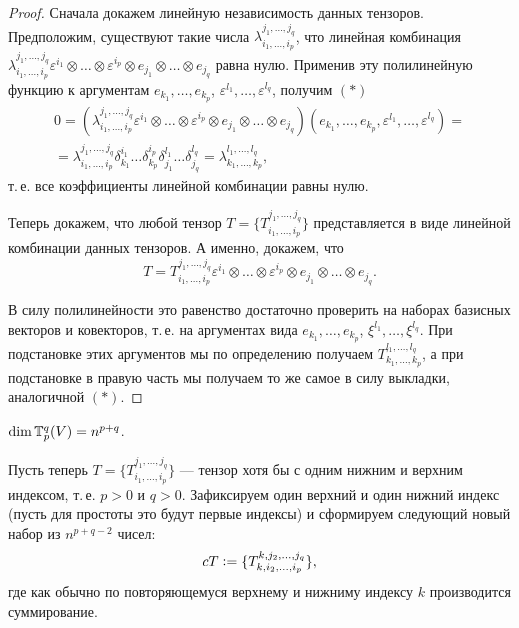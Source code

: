 \begin{proof}
    Сначала докажем линейную независимость данных тензоров. Предположим, существуют такие числа $\lambda_{i_1, \ldots, i_p}^{j_1, \ldots, j_q}$, что линейная комбинация $\lambda_{i_1, \ldots, i_p}^{j_1, \ldots, j_q}\varepsilon^{i_1} \otimes \ldots \otimes \varepsilon^{i_p} \otimes e_{j_1} \otimes \ldots \otimes e_{j_q}$ равна нулю. Применив эту полилинейную функцию к аргументам $e_{k_1}, \ldots, e_{k_p}$, $\varepsilon^{l_1}, \ldots, \varepsilon^{l_q}$, получим $(\ast)$
    \begin{multline*}
        0 = (\lambda_{i_1, \ldots, i_p}^{j_1, \ldots, j_q}\varepsilon^{i_1} \otimes \ldots \otimes \varepsilon^{i_p} \otimes e_{j_1} \otimes \ldots \otimes e_{j_q})(e_{k_1}, \ldots, e_{k_p}, \varepsilon^{l_1}, \ldots, \varepsilon^{l_q}) =\\ = \lambda_{i_1, \ldots, i_p}^{j_1, \ldots, j_q}\delta_{k_1}^{i_1}\ldots\delta_{k_p}^{i_p}\delta_{j_1}^{l_1}\ldots\delta_{j_q}^{l_q} = \lambda_{k_1, \ldots, k_p}^{l_1, \ldots, l_q},
    \end{multline*}
    т.\,е. все коэффициенты линейной комбинации равны нулю.

    Теперь докажем, что любой тензор $T = \{T_{i_1, \ldots, i_p}^{j_1, \ldots, j_q}\}$ представляется в виде линейной комбинации данных тензоров. А именно, докажем, что
    \[
        T = T_{i_1, \ldots, i_p}^{j_1, \ldots, j_q}\varepsilon^{i_1} \otimes \ldots \otimes \varepsilon^{i_p} \otimes e_{j_1} \otimes \ldots \otimes e_{j_q}.
    \]

    В силу полилинейности это равенство достаточно проверить на наборах базисных векторов и ковекторов, т.\,е. на аргументах вида $e_{k_1}, \ldots, e_{k_p}$, $\xi^{l_1}, \ldots, \xi^{l_q}$. При подстановке этих аргументов мы по определению получаем $T_{k_1, \ldots, k_p}^{l_1, \ldots, l_q}$, а при подстановке в правую часть мы получаем то же самое в силу выкладки, аналогичной $(\ast)$.
\end{proof}

\begin{corollary}
    $\dim\mathbb{T}_p^q(V) = n^{p + q}$.
\end{corollary}

Пусть теперь $T = \{T_{i_1, \ldots, i_p}^{j_1, \ldots, j_q}\}$ --- тензор хотя бы с одним нижним и верхним индексом, т.\,е. $p > 0$ и $q > 0$. Зафиксируем один верхний и один нижний индекс (пусть для простоты это будут первые индексы) и сформируем следующий новый набор из $n^{p + q - 2}$ чисел:
\[
    cT \vcentcolon = \{T_{k, i_2, \ldots, i_p}^{k, j_2, \ldots, j_q}\},
\]
где как обычно по повторяющемуся верхнему и нижниму индексу $k$ производится суммирование. 

